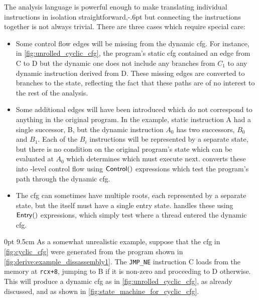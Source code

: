 The {\StateMachine} analysis language is powerful enough to make
translating individual instructions in isolation
straightforward,\kern-.6pt but connecting the instructions
together is not always trivial.  There are three cases which require
special care:
\begin{itemize}
\item
  Some control flow edges will be missing from the \gls{dynamic cfg}.
  For instance, in \autoref{fig:unrolled_cyclic_cfg}, the program's
  \gls{static cfg} contained an edge from C to D but the dynamic one
  does not include any branches from $C_1$ to any dynamic instruction
  derived from D.  These missing edges are converted to branches to
  the {\stUnreached} state, reflecting the fact that these paths are
  of no interest to the rest of the analysis.
\item
  Some additional edges will have been introduced which do not
  correspond to anything in the original program.  In the example,
  static instruction A had a single successor, B, but the dynamic
  instruction $A_0$ has two successors, $B_0$ and $B_1$.  Each of the
  $B_i$ instructions will be represented by a separate {\StateMachine}
  state, but there is no condition on the original program's state
  which can be evaluated at $A_0$ which determines which must execute
  next.  {\Technique} converts these into {\StateMachine}-level
  control flow using ${\mathsf{Control}}()$ expressions which test the
  program's path through the \gls{dynamic cfg}.
\item
  The \gls{cfg} can sometimes have multiple roots, each represented by
  a separate {\StateMachine} state, but the {\StateMachine} itself
  must have a single entry state.  {\Technique} handles these using
  $\mathsf{Entry}()$ expressions, which simply test where a thread entered
  the \gls{dynamic cfg}.
\end{itemize}

  0pt 9.5cm
\noindent As a somewhat unrealistic example, suppose that the
\gls{cfg} in \autoref{fig:cyclic_cfg} were generated from the program
shown in \autoref{fig:derive:example_dissassembly1}.  The
\texttt{JMP\_NE} instruction C loads from the memory at
\texttt{rcx+8}, jumping to B if it is non-zero and proceeding to D
otherwise.  This will produce a \gls{dynamic cfg} as in
\autoref{fig:unrolled_cyclic_cfg}, as already discussed, and
\AStateMachine{} as shown in
\autoref{fig:state_machine_for_cyclic_cfg}.

